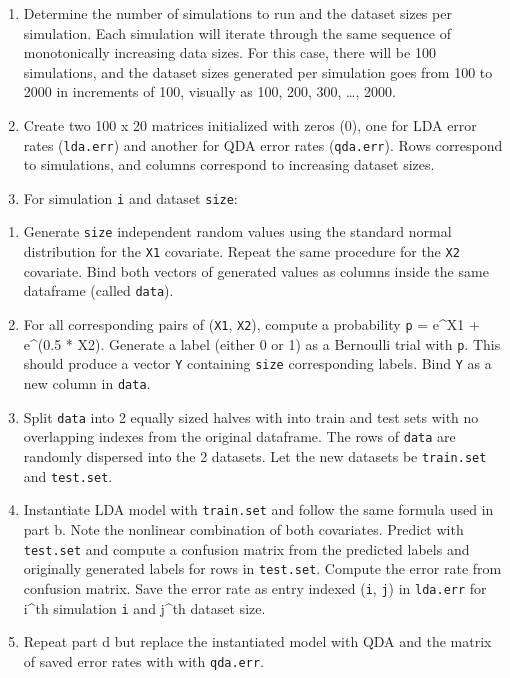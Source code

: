 \documentclass[
]{article}
\begin{document}
\begin{enumerate}
\def\labelenumi{\arabic{enumi}.}
\item
  Determine the number of simulations to run and the dataset sizes per
  simulation. Each simulation will iterate through the same sequence of
  monotonically increasing data sizes. For this case, there will be 100
  simulations, and the dataset sizes generated per simulation goes from
  100 to 2000 in increments of 100, visually as 100, 200, 300, \ldots,
  2000.
\item
  Create two 100 x 20 matrices initialized with zeros (0), one for LDA
  error rates (\texttt{\textquotesingle{}lda.err}) and another for QDA
  error rates (\texttt{qda.err}). Rows correspond to simulations, and
  columns correspond to increasing dataset sizes.
\item
  For simulation \texttt{i} and dataset \texttt{size}:
\end{enumerate}

\begin{enumerate}
\def\labelenumi{\alph{enumi}.}
\item
  Generate \texttt{size} independent random values using the standard
  normal distribution for the \texttt{X1} covariate. Repeat the same
  procedure for the \texttt{X2} covariate. Bind both vectors of
  generated values as columns inside the same dataframe (called
  \texttt{data}).
\item
  For all corresponding pairs of (\texttt{X1}, \texttt{X2}), compute a
  probability \texttt{p} = e\^{}X1 + e\^{}(0.5 * X2). Generate a label
  (either 0 or 1) as a Bernoulli trial with \texttt{p}. This should
  produce a vector \texttt{Y} containing \texttt{size} corresponding
  labels. Bind \texttt{Y} as a new column in \texttt{data}.
\item
  Split \texttt{data} into 2 equally sized halves with into train and
  test sets with no overlapping indexes from the original dataframe. The
  rows of \texttt{data} are randomly dispersed into the 2 datasets. Let
  the new datasets be \texttt{train.set} and \texttt{test.set}.
\item
  Instantiate LDA model with \texttt{train.set} and follow the same
  formula used in part b. Note the nonlinear combination of both
  covariates. Predict with \texttt{test.set} and compute a confusion
  matrix from the predicted labels and originally generated labels for
  rows in \texttt{test.set}. Compute the error rate from confusion
  matrix. Save the error rate as entry indexed (\texttt{i}, \texttt{j})
  in \texttt{lda.err} for i\^{}th simulation \texttt{i} and j\^{}th
  dataset size.
\item
  Repeat part d but replace the instantiated model with QDA and the
  matrix of saved error rates with with \texttt{qda.err}.
\end{enumerate}
\end{document}
